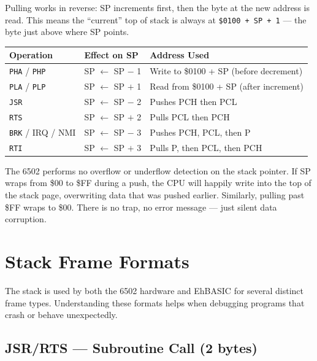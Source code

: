 Pulling works in reverse: SP increments first, then the byte at the new
address is read.  This means the ``current'' top of stack is always at
\texttt{\$0100 + SP + 1} --- the byte just above where SP points.

\begin{center}
\small
\begin{tabular}{@{}lll@{}}
\toprule
\textbf{Operation} & \textbf{Effect on SP} & \textbf{Address Used} \\
\midrule
\texttt{PHA} / \texttt{PHP}     & SP $\leftarrow$ SP $-$ 1 & Write to \$0100 + SP (before decrement) \\
\texttt{PLA} / \texttt{PLP}     & SP $\leftarrow$ SP $+$ 1 & Read from \$0100 + SP (after increment) \\
\texttt{JSR}                     & SP $\leftarrow$ SP $-$ 2 & Pushes PCH then PCL \\
\texttt{RTS}                     & SP $\leftarrow$ SP $+$ 2 & Pulls PCL then PCH \\
\texttt{BRK} / IRQ / NMI        & SP $\leftarrow$ SP $-$ 3 & Pushes PCH, PCL, then P \\
\texttt{RTI}                     & SP $\leftarrow$ SP $+$ 3 & Pulls P, then PCL, then PCH \\
\bottomrule
\end{tabular}
\end{center}

\begin{warningbox}
The 6502 performs no overflow or underflow detection on the stack pointer.
If SP wraps from \$00 to \$FF during a push, the CPU will happily write into
the top of the stack page, overwriting data that was pushed earlier.
Similarly, pulling past \$FF wraps to \$00.  There is no trap, no error
message --- just silent data corruption.
\end{warningbox}

\section{Stack Frame Formats}

The stack is used by both the 6502 hardware and EhBASIC for several distinct
frame types.  Understanding these formats helps when debugging programs that
crash or behave unexpectedly.

\subsection{JSR/RTS --- Subroutine Call (2 bytes)}

